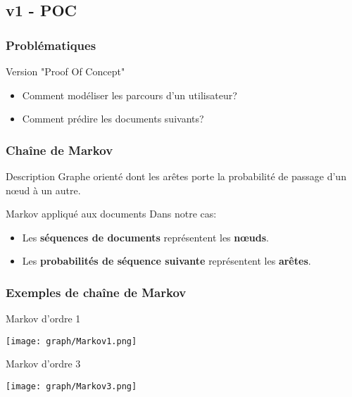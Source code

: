 \documentclass{beamer}
\begin{document}
        \subsection{v1 - POC}
            \begin{frame}
                \frametitle{Problématiques}
                Version "Proof Of Concept"
                \begin{itemize}
                    \pause
                    \item Comment modéliser les parcours d'un utilisateur?
                    \pause
                    \item Comment prédire les documents suivants?
                \end{itemize}
            \end{frame}
            \begin{frame}
                \frametitle{Chaîne de Markov}
                \begin{block}{Description}
                    Graphe orienté dont les arêtes porte la probabilité de passage d'un nœud à un autre.
                \end{block}
                \pause
                \begin{block}{Markov appliqué aux documents}
                    Dans notre cas:
                    \begin{itemize}
                        \item Les \textbf{séquences de documents} représentent les \textbf{nœuds}.
                        \item Les \textbf{probabilités de séquence suivante} représentent les \textbf{arêtes}.
                    \end{itemize}
                \end{block}
            \end{frame}
            \begin{frame}
                \frametitle{Exemples de chaîne de Markov}
                \pause
                \begin{exampleblock}{Markov d'ordre 1}
                    \begin{center}
                        \texttt{[image: graph/Markov1.png]}
                    \end{center}
                \end{exampleblock}
                \pause
                \begin{exampleblock}{Markov d'ordre 3}
                    \begin{center}
                        \texttt{[image: graph/Markov3.png]}
                    \end{center}
                \end{exampleblock}
            \end{frame}
\end{document}
